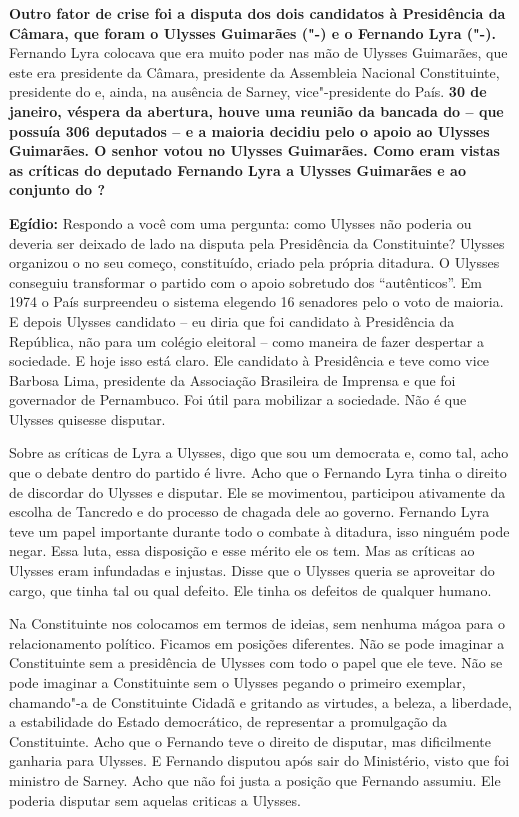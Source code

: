 \textbf{Outro fator de crise foi a disputa dos dois candidatos à
Presidência da Câmara, que foram o Ulysses Guimarães ("-) e o
Fernando Lyra ("-).} Fernando Lyra colocava que era muito poder nas
mão de Ulysses Guimarães, que este era presidente da Câmara, presidente
da Assembleia Nacional Constituinte, presidente do  e, ainda, na
ausência de Sarney, vice"-presidente do País. \textbf{30 de janeiro,
véspera da abertura, houve uma reunião da bancada do  -- que possuía
306 deputados -- e a maioria decidiu pelo o apoio ao Ulysses Guimarães.
O senhor votou no Ulysses Guimarães. Como eram vistas as críticas do
deputado Fernando Lyra a Ulysses Guimarães e ao conjunto do ?}

\textbf{Egídio:} Respondo a você com uma pergunta: como Ulysses não
poderia ou deveria ser deixado de lado na disputa pela Presidência da
Constituinte? Ulysses organizou o  no seu começo, constituído, criado
pela própria ditadura. O Ulysses conseguiu transformar o partido com o
apoio sobretudo dos ``autênticos''. Em 1974 o País surpreendeu o sistema
elegendo 16 senadores pelo o voto de maioria. E depois Ulysses candidato
-- eu diria que foi candidato à Presidência da República, não para um
colégio eleitoral -- como maneira de fazer despertar a sociedade. E hoje
isso está claro. Ele candidato à Presidência e teve como vice Barbosa
Lima, presidente da Associação Brasileira de Imprensa e que foi
governador de Pernambuco. Foi útil para mobilizar a sociedade. Não é que
Ulysses quisesse disputar.

Sobre as críticas de Lyra a Ulysses, digo que sou um democrata e, como
tal, acho que o debate dentro do partido é livre. Acho que o Fernando
Lyra tinha o direito de discordar do Ulysses e disputar. Ele se
movimentou, participou ativamente da escolha de Tancredo e do processo
de chagada dele ao governo. Fernando Lyra teve um papel importante
durante todo o combate à ditadura, isso ninguém pode negar. Essa luta,
essa disposição e esse mérito ele os tem. Mas as críticas ao Ulysses
eram infundadas e injustas. Disse que o Ulysses queria se aproveitar do
cargo, que tinha tal ou qual defeito. Ele tinha os defeitos de qualquer
humano.

Na Constituinte nos colocamos em termos de ideias, sem nenhuma mágoa
para o relacionamento político. Ficamos em posições diferentes. Não se
pode imaginar a Constituinte sem a presidência de Ulysses com todo o
papel que ele teve. Não se pode imaginar a Constituinte sem o Ulysses
pegando o primeiro exemplar, chamando"-a de Constituinte Cidadã e
gritando as virtudes, a beleza, a liberdade, a estabilidade do Estado
democrático, de representar a promulgação da Constituinte. Acho que o
Fernando teve o direito de disputar, mas dificilmente ganharia para
Ulysses. E Fernando disputou após sair do Ministério, visto que foi
ministro de Sarney. Acho que não foi justa a posição que Fernando
assumiu. Ele poderia disputar sem aquelas criticas a Ulysses.

